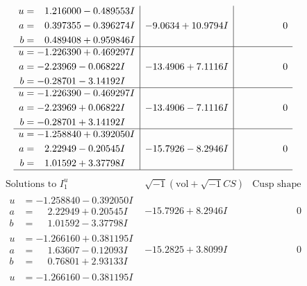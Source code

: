 \documentclass[1p]{elsarticle_modified}
\theoremstyle{definition}
\newcommand{\I}{\sqrt{-1}}
\begin{document}
$$\begin{array}{c|c|c}
\begin{aligned}
u &= \phantom{-}1.216000 - 0.489553 I \\
a &= \phantom{-}0.397355 - 0.396274 I \\
b &= \phantom{-}0.489408 + 0.959846 I\end{aligned}
 & -9.0634 + 10.9794 I & \phantom{-0.000000 } 0 \\ \hline\begin{aligned}
u &= -1.226390 + 0.469297 I \\
a &= -2.23969 - 0.06822 I \\
b &= -0.28701 - 3.14192 I\end{aligned}
 & -13.4906 + 7.1116 I & \phantom{-0.000000 } 0 \\ \hline\begin{aligned}
u &= -1.226390 - 0.469297 I \\
a &= -2.23969 + 0.06822 I \\
b &= -0.28701 + 3.14192 I\end{aligned}
 & -13.4906 - 7.1116 I & \phantom{-0.000000 } 0 \\ \hline\begin{aligned}
u &= -1.258840 + 0.392050 I \\
a &= \phantom{-}2.22949 - 0.20545 I \\
b &= \phantom{-}1.01592 + 3.37798 I\end{aligned}
 & -15.7926 - 8.2946 I & \phantom{-0.000000 } 0\\
 \hline 
 \end{array}$$\newpage$$\begin{array}{c|c|c}  
\text{Solutions to }I^u_{1}& \I (\text{vol} + \sqrt{-1}CS) & \text{Cusp shape}\\
 \hline 
\begin{aligned}
u &= -1.258840 - 0.392050 I \\
a &= \phantom{-}2.22949 + 0.20545 I \\
b &= \phantom{-}1.01592 - 3.37798 I\end{aligned}
 & -15.7926 + 8.2946 I & \phantom{-0.000000 } 0 \\ \hline\begin{aligned}
u &= -1.266160 + 0.381195 I \\
a &= \phantom{-}1.63607 - 0.12093 I \\
b &= \phantom{-}0.76801 + 2.93133 I\end{aligned}
 & -15.2825 + 3.8099 I & \phantom{-0.000000 } 0 \\ \hline\begin{aligned}
u &= -1.266160 - 0.381195 I \\

\end{aligned}
\end{array}$$
\end{document}
